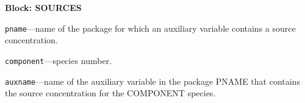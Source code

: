 
\item \textbf{Block: SOURCES}

\begin{description}
\item \texttt{pname}---name of the package for which an auxiliary variable contains a source concentration.

\item \texttt{component}---species number.

\item \texttt{auxname}---name of the auxiliary variable in the package PNAME that contains the source concentration for the COMPONENT species.

\end{description}

